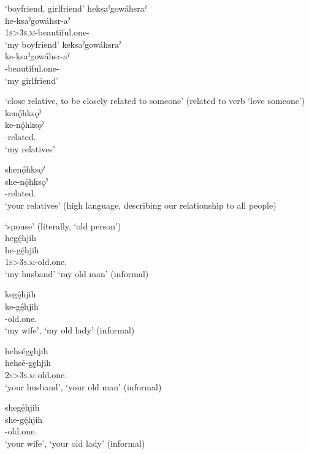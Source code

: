\ea\label{ex:interkintermppex29}  ‘boyfriend, girlfriend’ 
\ea heksaˀgowáhsraˀ\\
\gll he-ksaˀgowáhsr-aˀ\\
 \textsc{1s>3s.m}-beautiful.one-{\nounstemformer}\\
\glt `my boyfriend'
\ex keksaˀgowáhsraˀ\\
\gll ke-ksaˀgowáhsr-aˀ\\
 -beautiful.one-{\nounstemformer}\\
\glt `my girlfriend'
\z
\z

\ea\label{ex:samegeninlawex5}  ‘close relative, to be closely related to someone’ (related to verb  ‘love someone’)
\ea kenǫ́hksǫˀ\\
\gll ke-nǫ́hksǫˀ\\
 -related.{\pluralizer}\\
\glt `my relatives'

\ex shenǫ́hksǫˀ\\
\gll she-nǫ́hksǫˀ\\
-related.{\pluralizer}\\
\glt  ‘your relatives’ (high language, describing our relationship to all people)
\z
\z

\newpage
\ea\label{ex:samegeninlawex6}
 ‘spouse’ (literally, ‘old person’)\\
\ea hegę́hjih \\
\gll  he-gę́hjih \\
\textsc{1s>3s.m}-old.one.{\stative}\\
\glt  ‘my husband’  ‘my old man’ (informal)

\ex kegę́hjih \\
\gll  ke-gę́hjih \\
-old.one.{\stative}\\
\glt  ‘my wife’, ‘my old lady’ (informal)

\ex hehségę̱hjih \\
\gll  hehsé-gę̱hjih\\
\textsc{2s>3s.m}-old.one.{\stative}\\
\glt  ‘your husband’, ‘your old man’ (informal)

\ex shegę́hjih \\
\gll  she-gę́hjih\\
-old.one.{\stative}\\
\glt  ‘your wife’, ‘your old lady’ (informal)

